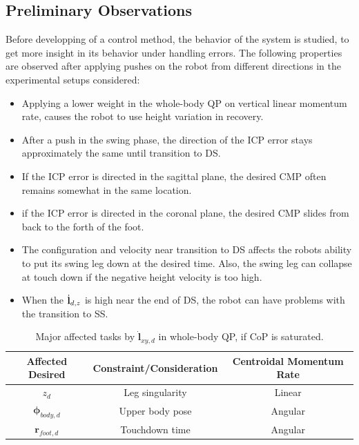 \subsection{Preliminary Observations}
Before developping of a control method, the behavior of the system is studied, to get more insight in its behavior under handling errors. The following properties are observed after applying pushes on the robot from different directions in the experimental setups considered:
\begin{itemize}
	\item Applying a lower weight in the whole-body \ac{QP} on vertical linear momentum rate, causes the robot to use height variation in recovery.
	\item After a push in the swing phase, the direction of the \ac{ICP} error stays approximately the same until transition to \ac{DS}.
	\item If the \ac{ICP} error is directed in the sagittal plane, the desired \ac{CMP} often remains somewhat in the same location.
	\item if the \ac{ICP} error is directed  in the coronal plane, the desired \ac{CMP} slides from back to the forth of the foot.
	\item The configuration and velocity near transition to \ac{DS} affects the robots ability to put its swing leg down at the desired time. Also, the swing leg can collapse at touch down if the negative height velocity is too high.
	\item When the $\dot{\mathbf{l}}_{d,z}$ is high near the end of \ac{DS}, the robot can have problems with the transition to \ac{SS}.
\end{itemize}
\begin{table}[ht]
\caption{Major affected tasks by $\mathbf{\dot{l}}_{xy,d}$ in whole-body QP, if \ac{CoP} is saturated.} %
\centering %
\begin{tabular}{c c c } %
\hline\hline %
Affected Desired & Constraint/Consideration & Centroidal Momentum Rate \\
\hline %
 $z_d$ & Leg singularity & Linear\\
 $\boldsymbol{\phi}_{body,d}$ & Upper body pose & Angular\\
 $\mathbf{r}_{foot,d}$ &  Touchdown time & Angular\\
\hline %
\end{tabular}
\label{tab:eatqp} %
\end{table}
